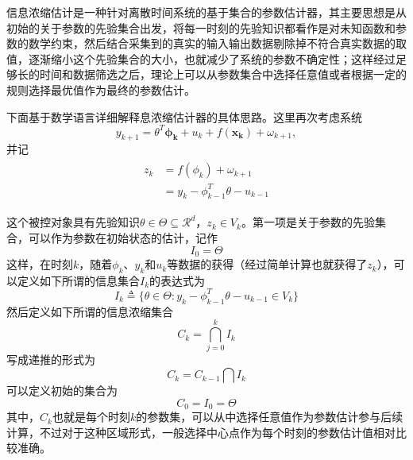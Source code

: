信息浓缩估计是一种针对离散时间系统的基于集合的参数估计器，其主要思想是从初始的关于参数的先验集合出发，将每一时刻的先验知识都看作是对未知函数和参数的数学约束，然后结合采集到的真实的输入输出数据剔除掉不符合真实数据的取值，逐渐缩小这个先验集合的大小，也就减少了系统的参数不确定性；这样经过足够长的时间和数据筛选之后，理论上可以从参数集合中选择任意值或者根据一定的规则选择最优值作为最终的参数估计。

下面基于数学语言详细解释息浓缩估计器的具体思路。这里再次考虑系统
\begin{equation}%
\label{eq:semi-u2}
y_{k+1} = \theta^{T}\bm{\phi_{k}}+u_{k}+f(\bm{x_{k}})+\omega_{k+1},
\end{equation}
并记
\begin{eqnarray}
\label{eq:zk}
\begin{split}%
z_{k} & = f(\phi_{k}) + \omega_{k+1}\\
& = y_{k}-\phi_{k-1}^{T}\theta-u_{k-1}
\end{split}
\end{eqnarray}

这个被控对象具有先验知识$\theta\in\Theta\subseteq\mathcal{R}^{d}$，$z_{k}\in V_{k}$。第一项是关于参数的先验集合，可以作为参数在初始状态的估计，记作
\begin{equation}%
I_{0}=\Theta
\end{equation}
这样，在时刻$k$，随着$\phi_{k}$、$y_{k}$和$u_{k}$等数据的获得（经过简单计算也就获得了$z_{k}$），可以定义如下所谓的信息集合$I_{k}$的表达式为
\begin{equation}
\label{eq.Ik}
I_{k}\triangleq\{\theta\in\Theta\colon y_{k}-\phi_{k-1}^{T}\theta-u_{k-1}\in V_{k}\}
\end{equation}
然后定义如下所谓的信息浓缩集合
\begin{equation}
\label{eq.CkIk}
C_{k} = \bigcap_{j=0}^{k}I_{k}
\end{equation}
写成递推的形式为
\begin{equation}
\label{eq.Ck2}
C_{k} = C_{k-1} \bigcap I_{k}
\end{equation}
可以定义初始的集合为
\begin{equation}
\label{eq.C0}
C_{0}=I_{0}=\Theta
\end{equation}
其中，$C_{k}$也就是每个时刻$k$的参数集，可以从中选择任意值作为参数估计参与后续计算，不过对于这种区域形式，一般选择中心点作为每个时刻的参数估计值相对比较准确。

